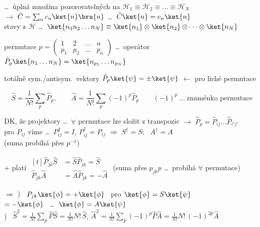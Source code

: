 \dots\ úplná množina pozorovatelných na $\mathcal{H}_1\equiv\mathcal{H}_2\equiv\dots\equiv\mathcal{H}_N$ \\
\quad $\to$ \quad $\hat C = \sum_n c_n\ket{n}\bra{n}$ \quad \dots\ $\hat C\ket{n} = c_n\ket{n}$ \\
stavy z $\mathcal{H}$ \dots\ $\ket{n_1n_2\dots n_N} \equiv \ket{n_1}\otimes\ket{n_2}\otimes\dots\otimes\ket{n_N}$

permutace $p = \begin{pmatrix} 1 & 2 & \dots & n \\ p_1 & p_2 & \dots & p_n\end{pmatrix}$ \quad \dots\ operátor \quad
$\hat P_p\ket{n_1\dots n_N} = \ket{n_{p_1}\dots n_{p_N}}$ \\

totálně sym./antisym.\ vektory \quad $\hat P_p\ket{\psi} = \pm\ket{\psi}$ \quad $\leftarrow$ pro liché permutace

\begin{veta}
\[
  \hat S = \frac{1}{N!}\sum_p\hat P_p, \qquad
  \hat A = \frac{1}{N!}\sum_p(-1)^p\hat P_p \qquad (-1)^p\ \dots\ \text{znaménko permutace}
\]
\end{veta}

DK, že projektory \dots\ $\forall$ permutace lze složit z transpozic $\to$ $\hat P_p = \hat P_{ij}\dots\hat P_{i'j'}$ \\
\quad pro $P_{ij}$ víme \dots\ $P_{ij}^2 = I$, \quad $P_{ij}^\dagger = P_{ij}$ \quad $\Rightarrow$ \quad $S^\dagger = S$; \ $A^\dagger = A$ \\
\hspace*{9.5cm} (suma probíhá přes $p^{-1}$)

+ platí \quad
$\begin{aligned}[t]
  \hat P_{jk}\hat S &= \hat S\hat P_{jk} = \hat S \\
  \hat P_{jk}\hat A &= \hat A\hat P_{jk} = -\hat A
\end{aligned}$
\quad (suma přes $p_{jk}p$ \dots\ probíhá $\forall$ permutace)

$\Rightarrow$ ) \ $P_{jk}\ket{\phi} = +\ket{\phi}$ \ pro $\ket{\phi} = S\ket{\psi}$ \\
\hspace*{1.95cm} $= -\ket{\phi}$ \ \dots\ $\ket{\phi} = A\ket{\psi}$ \\[3pt]
\quad{}) \ $\hat S^2 = \frac{1}{N!}\sum_p\hat P\hat S = \frac{1}{N!}N!\,\hat S$, \qquad
$\hat A^2 = \frac{1}{N!}\sum_p(-1)^p\hat P\hat A = \frac{1}{N!}N!\,(-1)^{2p}\hat A$

